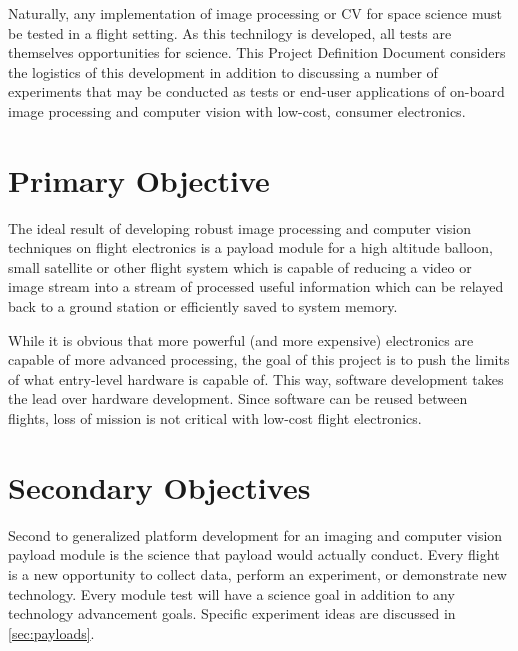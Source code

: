 \documentclass[conference]{IEEEtran} %
\begin{document}
Naturally, any implementation of image processing or CV for space science must be tested in a flight setting.
As this technilogy is developed, all tests are themselves opportunities for science.
This Project Definition Document considers the logistics of this development in addition to discussing a number of experiments that may be conducted as tests or end-user applications of on-board image processing and computer vision with low-cost, consumer electronics.

\section{Primary Objective}
\label{sec:primary-obj}

The ideal result of developing robust image processing and computer vision techniques on flight electronics is a payload module for a high altitude balloon, small satellite or other flight system which is capable of reducing a video or image stream into a stream of processed useful information which can be relayed back to a ground station or efficiently saved to system memory.

While it is obvious that more powerful (and more expensive) electronics are capable of more advanced processing, the goal of this project is to push the limits of what entry-level hardware is capable of.
This way, software development takes the lead over hardware development.
Since software can be reused between flights, loss of mission is not critical with low-cost flight electronics.

\section{Secondary Objectives}
\label{sec:secondary-obj}
Second to generalized platform development for an imaging and computer vision payload module is the science that payload would actually conduct.
Every flight is a new opportunity to collect data, perform an experiment, or demonstrate new technology.
Every module test will have a science goal in addition to any technology advancement goals.
Specific experiment ideas are discussed in \autoref{sec:payloads}.
\end{document}
